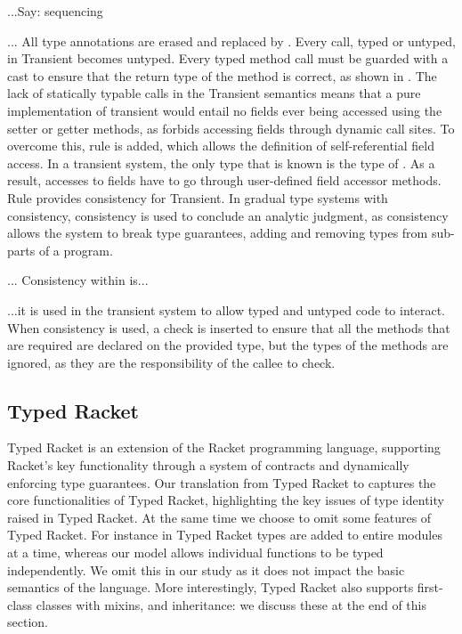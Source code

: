 \documentclass[acmlarge, anonymous, authordraft, review]{acmart} %
\begin{document}
...Say: sequencing


... All type
annotations are erased and replaced by \any.  Every call, typed or untyped,
in Transient becomes untyped.  Every typed method call must be guarded with
a cast to ensure that the return type of the method is correct, as shown in
.  The lack of statically typable calls in the Transient
semantics means that a pure implementation of transient would entail no
fields ever being accessed using the setter or getter methods, as \kafka
forbids accessing fields through dynamic call sites. To overcome this, rule
 is added, which allows the definition of self-referential
field access. In a transient system, the only type that is known is the type
of \this.  As a result, accesses to fields have to go through user-defined
field accessor methods.  Rule  provides consistency for
Transient. In gradual type systems with consistency, consistency is used to
conclude an analytic judgment, as consistency allows the system to break
type guarantees, adding and removing types from sub-parts of  a
program. 

... Consistency within \kafka is...

...it is used in the transient system to allow typed and untyped code to
interact. When consistency is used, a check is inserted to ensure that all
the methods that are required are declared on the provided type, but the
types of the methods are ignored, as they are the responsibility of the
callee to check.




\subsection{Typed Racket}

Typed Racket is an extension of the Racket programming
language, supporting Racket's key functionality 
through a system of contracts and dynamically enforcing type
guarantees.  Our translation from Typed Racket to \kafka captures the core
functionalities of Typed Racket, highlighting the key issues of type identity
raised in Typed Racket.   At the same time we choose to omit some features of Typed Racket.  
For instance in Typed Racket types are added to entire modules at a time, whereas our
model allows individual functions to be typed independently.  We omit this in our study as it does not impact the basic semantics of the language.   More interestingly, Typed Racket also supports first-class classes with mixins, and inheritance:  we discuss these at the end of this section.
\end{document}
